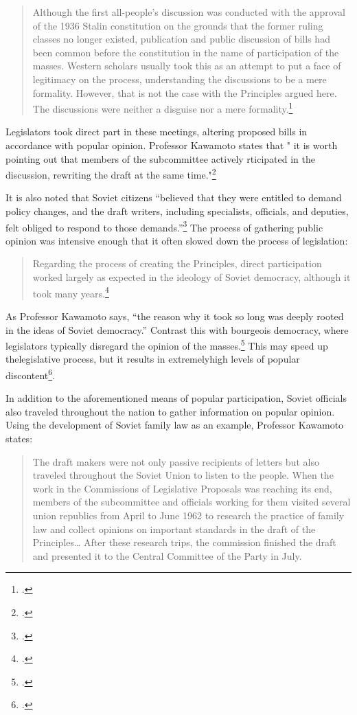 \begin{quote}
Although the first all-people's discussion was conducted with the
approval of the 1936 Stalin constitution on the grounds that the former
ruling classes no longer existed, publication and public discussion of
bills had been common before the constitution in the name of
participation of the masses. Western scholars usually took this as an
attempt to put a face of legitimacy on the process, understanding the
discussions to be a mere formality. However, that is not the case with
the Principles argued here. The discussions were neither a disguise nor
a mere formality.\footcite{kawamoto2014rethinking}
\end{quote}

Legislators took direct part in these meetings, altering proposed bills
in accordance with popular opinion. Professor Kawamoto states that " it
is worth pointing out that members of the subcommittee actively
rticipated in the discussion, rewriting the draft at the same time."\footcite{kawamoto2014rethinking}

It is also noted that Soviet citizens ``believed that they were entitled
to demand policy changes, and the draft writers, including specialists,
officials, and deputies, felt obliged to respond to those demands.''\footcite{kawamoto2014rethinking} The
process of gathering public opinion was intensive enough that it often
slowed down the process of legislation:

\begin{quote}
Regarding the process of creating the Principles, direct participation
worked largely as expected in the ideology of Soviet democracy, although
it took many years.\footcite{kawamoto2014rethinking}
\end{quote}

As Professor Kawamoto says, ``the reason why it took so long was deeply
rooted in the ideas of Soviet democracy.'' Contrast this with bourgeois
democracy, where legislators typically disregard the opinion of the masses.\footcite{gilens2014testing}
This may speed up thelegislative process, but it results in
extremelyhigh levels of popular discontent\footcite{rampell2015americans}.

In addition to the aforementioned means of popular participation, Soviet
officials also traveled throughout the nation to gather information on
popular opinion. Using the development of Soviet family law as an
example, Professor Kawamoto states:

\begin{quote}
The draft makers were not only passive recipients of letters but also
traveled throughout the Soviet Union to listen to the people. When the
work in the Commissions of Legislative Proposals was reaching its end,
members of the subcommittee and officials working for them visited
several union republics from April to June 1962 to research the practice
of family law and collect opinions on important standards in the draft
of the Principles\ldots{} After these research trips, the commission
finished the draft and presented it to the Central Committee of the
Party in July.
\end{quote}

